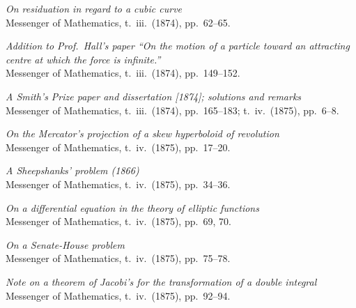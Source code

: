\documentclass[11pt]{article}
\begin{document}
\begin{description}\itemsep=2pt
\item[589.] \textit{On residuation in regard to a cubic curve}\\
\hspace*{1em}\small Messenger of Mathematics, t.~iii.\ (1874), pp.~62--65.

\item[590.] \textit{Addition to Prof.\ Hall's paper ``On the motion of a particle toward an attracting centre at which the force is infinite.''}\\
\hspace*{1em}\small Messenger of Mathematics, t.~iii.\ (1874), pp.~149--152.

\item[591.] \textit{A Smith's Prize paper and dissertation [1874]; solutions and remarks}\\
\hspace*{1em}\small Messenger of Mathematics, t.~iii.\ (1874), pp.~165--183; t.~iv.\ (1875), pp.~6--8.

\item[592.] \textit{On the Mercator's projection of a skew hyperboloid of revolution}\\
\hspace*{1em}\small Messenger of Mathematics, t.~iv.\ (1875), pp.~17--20.

\item[593.] \textit{A Sheepshanks' problem (1866)}\\
\hspace*{1em}\small Messenger of Mathematics, t.~iv.\ (1875), pp.~34--36.

\item[594.] \textit{On a differential equation in the theory of elliptic functions}\\
\hspace*{1em}\small Messenger of Mathematics, t.~iv.\ (1875), pp.~69, 70.

\item[595.] \textit{On a Senate-House problem}\\
\hspace*{1em}\small Messenger of Mathematics, t.~iv.\ (1875), pp.~75--78.

\item[596.] \textit{Note on a theorem of Jacobi's for the transformation of a double integral}\\
\hspace*{1em}\small Messenger of Mathematics, t.~iv.\ (1875), pp.~92--94.


\end{description}
\end{document}
